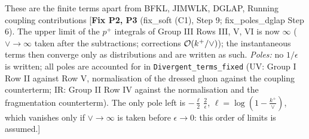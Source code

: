 \documentclass[9pt]{article}
\numberwithin{equation}{section}
\begin{document}
These are the finite terms apart from BFKL, JIMWLK, DGLAP, Running coupling contributions
{\color{red}[\textbf{Fix P2, P3} (fix\_soft (C1), Step 9; fix\_poles\_dglap Step 6). The upper limit of the $p^{+}$ integrals of Group III Rows III, V, VI is now $\infty$ ($\vee\to\infty$ taken after the subtractions; corrections ${\cal O}(k^{+}/\vee)$); the instantaneous terms then converge only as distributions and are written as such. \emph{Poles:} no $1/\epsilon$ is written; all poles are accounted for in \texttt{Divergent\_terms\_fixed} (UV: Group I Row II against Row V, normalisation of the dressed gluon against the coupling counterterm; IR: Group II Row IV against the normalisation and the fragmentation counterterm). The only pole left is $-\frac{\ell}{2}\,\frac{2}{\epsilon}$, $\ell=\log(1-\frac{k^{+}}{\vee})$, which vanishes only if $\vee\to\infty$ is taken before $\epsilon\to0$: this order of limits is assumed.]}\
\end{document}
